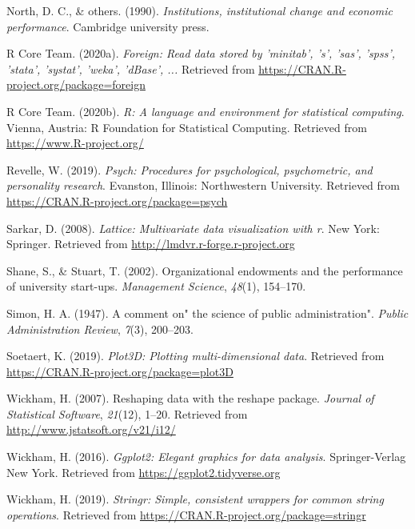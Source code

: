 \documentclass[
  english,
  man]{apa6}
\begin{document}
\leavevmode\hypertarget{ref-north1990institutions}{}%
North, D. C., \& others. (1990). \emph{Institutions, institutional change and economic performance}. Cambridge university press.

\leavevmode\hypertarget{ref-R-foreign}{}%
R Core Team. (2020a). \emph{Foreign: Read data stored by 'minitab', 's', 'sas', 'spss', 'stata', 'systat', 'weka', 'dBase', ...} Retrieved from \url{https://CRAN.R-project.org/package=foreign}

\leavevmode\hypertarget{ref-R-base}{}%
R Core Team. (2020b). \emph{R: A language and environment for statistical computing}. Vienna, Austria: R Foundation for Statistical Computing. Retrieved from \url{https://www.R-project.org/}

\leavevmode\hypertarget{ref-R-psych}{}%
Revelle, W. (2019). \emph{Psych: Procedures for psychological, psychometric, and personality research}. Evanston, Illinois: Northwestern University. Retrieved from \url{https://CRAN.R-project.org/package=psych}

\leavevmode\hypertarget{ref-R-lattice}{}%
Sarkar, D. (2008). \emph{Lattice: Multivariate data visualization with r}. New York: Springer. Retrieved from \url{http://lmdvr.r-forge.r-project.org}

\leavevmode\hypertarget{ref-shane2002organizational}{}%
Shane, S., \& Stuart, T. (2002). Organizational endowments and the performance of university start-ups. \emph{Management Science}, \emph{48}(1), 154--170.

\leavevmode\hypertarget{ref-simon1947comment}{}%
Simon, H. A. (1947). A comment on" the science of public administration". \emph{Public Administration Review}, \emph{7}(3), 200--203.

\leavevmode\hypertarget{ref-R-plot3D}{}%
Soetaert, K. (2019). \emph{Plot3D: Plotting multi-dimensional data}. Retrieved from \url{https://CRAN.R-project.org/package=plot3D}

\leavevmode\hypertarget{ref-R-reshape2}{}%
Wickham, H. (2007). Reshaping data with the reshape package. \emph{Journal of Statistical Software}, \emph{21}(12), 1--20. Retrieved from \url{http://www.jstatsoft.org/v21/i12/}

\leavevmode\hypertarget{ref-R-ggplot2}{}%
Wickham, H. (2016). \emph{Ggplot2: Elegant graphics for data analysis}. Springer-Verlag New York. Retrieved from \url{https://ggplot2.tidyverse.org}

\leavevmode\hypertarget{ref-R-stringr}{}%
Wickham, H. (2019). \emph{Stringr: Simple, consistent wrappers for common string operations}. Retrieved from \url{https://CRAN.R-project.org/package=stringr}
\end{document}
